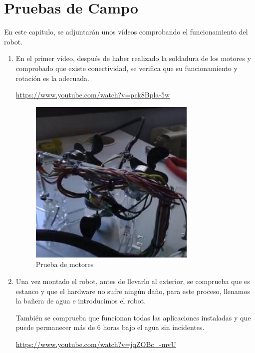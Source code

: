 \chapter{Pruebas de Campo}

En este capitulo, se adjuntarán unos vídeos comprobando el funcionamiento del robot.

\begin{enumerate}
\item En el primer vídeo, después de haber realizado la soldadura de los motores y comprobado que existe conectividad, se verifica que su funcionamiento y rotación es la adecuada.
 \begin{center}
  \url{https://www.youtube.com/watch?v=pck8Bpla-5w}
 \end{center}
 
 \begin{figure} [hbtp]
  \begin{center}
    \includegraphics[width=8cm]{img/cap5/motores}
  \end{center}
  \caption{Prueba de motores}
  \label{fig:motores}
 \end{figure}

\newpage
\item Una vez montado el robot, antes de llevarlo al exterior, se comprueba que es estanco y que el hardware no sufre ningún daño, para este proceso, llenamos la bañera de agua e introducimos el robot.
 
También se comprueba que funcionan todas las aplicaciones instaladas y que puede permanecer más de 6 horas bajo el agua sin incidentes.

\begin{center}
\url{https://www.youtube.com/watch?v=jqZOBc_-mvU}
\end{center}


\end{enumerate}
